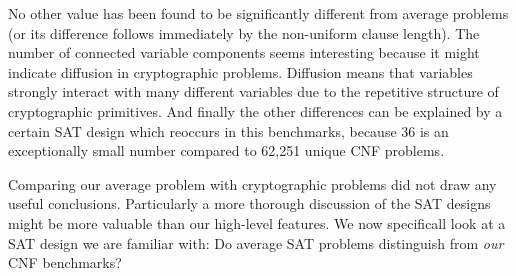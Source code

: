 No other value has been found to be significantly different from
average problems (or its difference follows immediately by the
non-uniform clause length). The number of connected variable
components seems interesting because it might indicate diffusion
in cryptographic problems. Diffusion means that variables strongly
interact with many different variables due to the repetitive
structure of cryptographic primitives. And finally the other
differences can be explained by a certain SAT design which
reoccurs in this benchmarks, because 36 is an exceptionally small
number compared to 62,251 unique CNF problems.

Comparing our average problem with cryptographic problems did
not draw any useful conclusions. Particularly a more thorough discussion
of the SAT designs might be more valuable than our high-level features.
We now specificall look at a SAT design we are familiar with:
Do average SAT problems distinguish from \emph{our} CNF benchmarks?

